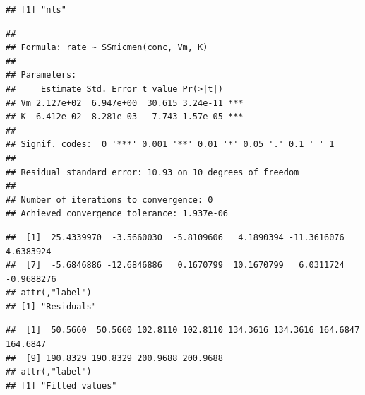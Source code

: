 \documentclass[krantz2]{krantz}\usepackage{knitr}
\begin{document}
\begin{knitrout}\footnotesize
{}\color{fgcolor}\begin{kframe}
\begin{alltt}
\end{alltt}
\begin{verbatim}
## [1] "nls"
\end{verbatim}
\begin{alltt}
\end{alltt}
\begin{verbatim}
## 
## Formula: rate ~ SSmicmen(conc, Vm, K)
## 
## Parameters:
##     Estimate Std. Error t value Pr(>|t|)    
## Vm 2.127e+02  6.947e+00  30.615 3.24e-11 ***
## K  6.412e-02  8.281e-03   7.743 1.57e-05 ***
## ---
## Signif. codes:  0 '***' 0.001 '**' 0.01 '*' 0.05 '.' 0.1 ' ' 1
## 
## Residual standard error: 10.93 on 10 degrees of freedom
## 
## Number of iterations to convergence: 0 
## Achieved convergence tolerance: 1.937e-06
\end{verbatim}
\begin{alltt}
\end{alltt}
\begin{verbatim}
##  [1]  25.4339970  -3.5660030  -5.8109606   4.1890394 -11.3616076   4.6383924
##  [7]  -5.6846886 -12.6846886   0.1670799  10.1670799   6.0311724  -0.9688276
## attr(,"label")
## [1] "Residuals"
\end{verbatim}
\begin{alltt}
\end{alltt}
\begin{verbatim}
##  [1]  50.5660  50.5660 102.8110 102.8110 134.3616 134.3616 164.6847 164.6847
##  [9] 190.8329 190.8329 200.9688 200.9688
## attr(,"label")
## [1] "Fitted values"
\end{verbatim}
\end{kframe}
\end{knitrout}
\end{document}
